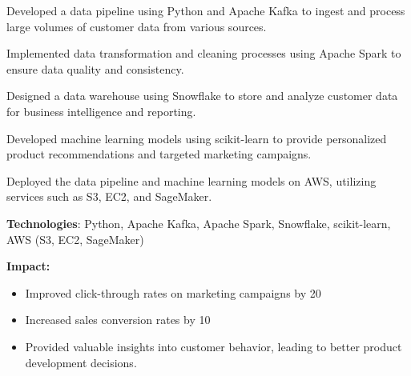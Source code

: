 \documentclass[]{deedy-resume-openfont}
\begin{document}
\begin{minipage}[t]{0.66\textwidth}
\begin{tightemize}
\item Developed a data pipeline using Python and Apache Kafka to ingest and process large volumes of customer data from various sources.
\item Implemented data transformation and cleaning processes using Apache Spark to ensure data quality and consistency.
\item Designed a data warehouse using Snowflake to store and analyze customer data for business intelligence and reporting.
\item Developed machine learning models using scikit-learn to provide personalized product recommendations and targeted marketing campaigns.
\item Deployed the data pipeline and machine learning models on AWS, utilizing services such as S3, EC2, and SageMaker.
\item \textbf{Technologies}: Python, Apache Kafka, Apache Spark, Snowflake, scikit-learn, AWS (S3, EC2, SageMaker)
\item \textbf{Impact:}
    \begin{itemize}
        \item Improved click-through rates on marketing campaigns by 20%
        \item Increased sales conversion rates by 10%
        \item Provided valuable insights into customer behavior, leading to better product development decisions.
    \end{itemize}
\end{tightemize}
\sectionsep




\end{minipage}
\end{document}
